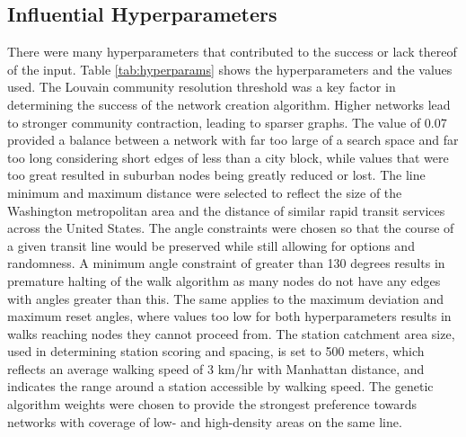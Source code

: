 \documentclass[sigconf,nonacm]{acmart}
\begin{document}
\subsection{Influential Hyperparameters}
There were many hyperparameters that contributed to the success or lack thereof of the input. Table \ref{tab:hyperparams} shows the hyperparameters and the values used. The Louvain community resolution threshold was a key factor in determining the success of the network creation algorithm. Higher networks lead to stronger community contraction, leading to sparser graphs. The value of 0.07 provided a balance between a network with far too large of a search space and far too long considering short edges of less than a city block, while values that were too great resulted in suburban nodes being greatly reduced or lost. The line minimum and maximum distance were selected to reflect the size of the Washington metropolitan area and the distance of similar rapid transit services across the United States. The angle constraints were chosen so that the course of a given transit line would be preserved while still allowing for options and randomness. A minimum angle constraint of greater than 130 degrees results in premature halting of the walk algorithm as many nodes do not have any edges with angles greater than this. The same applies to the maximum deviation and maximum reset angles, where values too low for both hyperparameters results in walks reaching nodes they cannot proceed from. The station catchment area size, used in determining station scoring and spacing, is set to 500 meters, which reflects an average walking speed of 3 km/hr with Manhattan distance, and indicates the range around a station accessible by walking speed. The genetic algorithm weights were chosen to provide the strongest preference towards networks with coverage of low- and high-density areas on the same line. 
\end{document}

